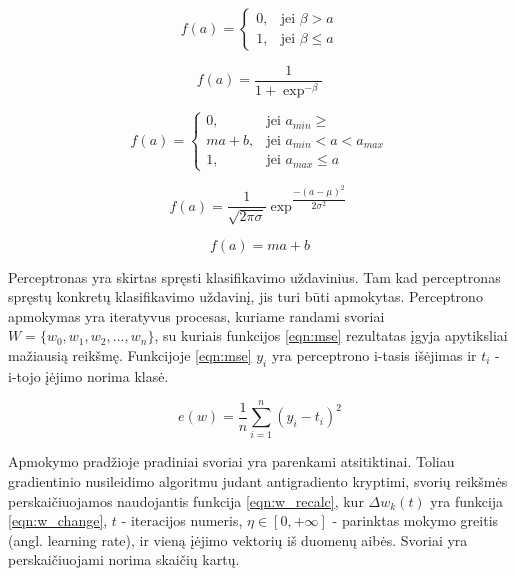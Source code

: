\begin{equation}
	\label{eqn:unitStep}
	f(a) =
	\begin{cases}
		0, & \mbox{jei } \beta > a \\
		1, & \mbox{jei } \beta \leq a
	\end{cases}
\end{equation}

\begin{equation}
	\label{eqn:sigmoid}
	f(a) = \dfrac{1}{1 + \exp^{-\beta }}
\end{equation}

\begin{equation}
	\label{eqn:pieceLinear}
	f(a) =
	\begin{cases}
		0, & \mbox{jei } a_{min} \geq  \\
		ma + b, & \mbox{jei } a_{min} < a < a_{max} \\
		1, & \mbox{jei } a_{max} \leq a
	\end{cases}
\end{equation}

\begin{equation}
	\label{eqn:gaussian}
	f(a) = \dfrac{1}{\sqrt{2\pi\sigma}} \exp^{\dfrac{-(a - \mu)^2}{2\sigma^2}}
\end{equation}

\begin{equation}
	\label{eqn:linear}
	f(a) = ma + b
\end{equation}

Perceptronas yra skirtas spręsti klasifikavimo uždavinius. Tam kad perceptronas spręstų konkretų klasifikavimo uždavinį, jis turi būti apmokytas. Perceptrono apmokymas yra iteratyvus procesas, kuriame randami svoriai $W = \{w_{0}, w_{1}, w_{2}, ..., w_{n}\}$, su kuriais funkcijos \ref{eqn:mse} rezultatas įgyja apytiksliai mažiausią reikšmę. Funkcijoje \ref{eqn:mse} $y_i$ yra perceptrono i-tasis išėjimas ir $t_i$ - i-tojo įėjimo norima klasė.

\begin{equation}
	\label{eqn:mse}
	e(w) = \dfrac{1}{n}\sum_{i=1}^{n}(y_i - t_i)^2
\end{equation}

Apmokymo pradžioje pradiniai svoriai yra parenkami atsitiktinai. Toliau gradientinio nusileidimo algoritmu judant antigradiento kryptimi, svorių reikšmės perskaičiuojamos naudojantis funkcija \ref{eqn:w_recalc}, kur $\Delta w_k(t)$ yra funkcija \ref{eqn:w_change}, $t$ - iteracijos numeris, $\eta \in [0, +\infty]$ - parinktas mokymo greitis (angl. learning rate), ir vieną įėjimo vektorių iš duomenų aibės. Svoriai yra perskaičiuojami norima skaičių kartų.

